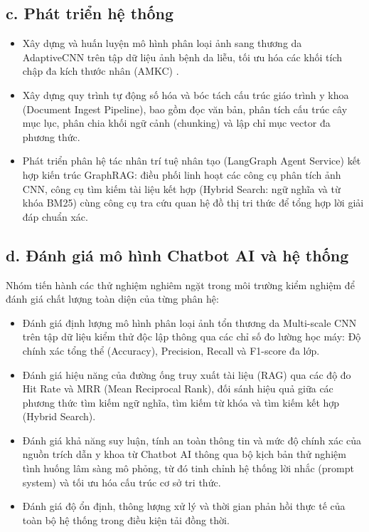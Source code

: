 \subsection*{c. Phát triển hệ thống}
\begin{itemize}
  \item Xây dựng và huấn luyện mô hình phân loại ảnh sang thương da AdaptiveCNN trên tập dữ liệu ảnh bệnh da liễu, tối ưu hóa các khối tích chập đa kích thước nhân (AMKC) .
  \item Xây dựng quy trình tự động số hóa và bóc tách cấu trúc giáo trình y khoa (Document Ingest Pipeline), bao gồm đọc văn bản, phân tích cấu trúc cây mục lục, phân chia khối ngữ cảnh (chunking) và lập chỉ mục vector đa phương thức.
  \item Phát triển phân hệ tác nhân trí tuệ nhân tạo (LangGraph Agent Service) kết hợp kiến trúc GraphRAG: điều phối linh hoạt các công cụ phân tích ảnh CNN, công cụ tìm kiếm tài liệu kết hợp (Hybrid Search: ngữ nghĩa và từ khóa BM25) cùng công cụ tra cứu quan hệ đồ thị tri thức để tổng hợp lời giải đáp chuẩn xác.
\end{itemize}

\subsection*{d. Đánh giá mô hình Chatbot AI và hệ thống}

Nhóm tiến hành các thử nghiệm nghiêm ngặt trong môi trường kiểm nghiệm để đánh giá chất lượng toàn diện của từng phân hệ:
\begin{itemize}
  \item Đánh giá định lượng mô hình phân loại ảnh tổn thương da Multi-scale CNN trên tập dữ liệu kiểm thử độc lập thông qua các chỉ số đo lường học máy: Độ chính xác tổng thể (Accuracy), Precision, Recall và F1-score đa lớp.
  \item Đánh giá hiệu năng của đường ống truy xuất tài liệu (RAG) qua các độ đo Hit Rate và MRR (Mean Reciprocal Rank), đối sánh hiệu quả giữa các phương thức tìm kiếm ngữ nghĩa, tìm kiếm từ khóa và tìm kiếm kết hợp (Hybrid Search).
  \item Đánh giá khả năng suy luận, tính an toàn thông tin và mức độ chính xác của nguồn trích dẫn y khoa từ Chatbot AI thông qua bộ kịch bản thử nghiệm tình huống lâm sàng mô phỏng, từ đó tinh chỉnh hệ thống lời nhắc (prompt system) và tối ưu hóa cấu trúc cơ sở tri thức.
  \item Đánh giá độ ổn định, thông lượng xử lý và thời gian phản hồi thực tế của toàn bộ hệ thống trong điều kiện tải đồng thời.
\end{itemize}

